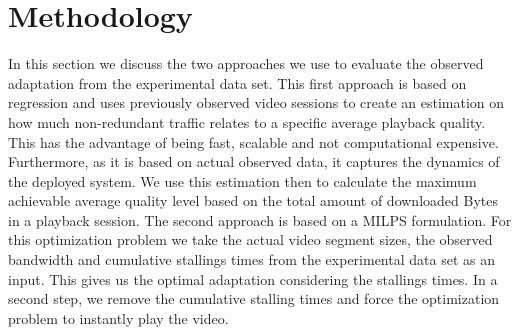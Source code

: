 
\section{Methodology}

\label{sec:sysmodel}

In this section we discuss the two approaches we use to evaluate the observed adaptation from the experimental data set.
This first approach is based on regression and uses previously observed video sessions to create an estimation on how much non-redundant traffic relates to a specific average playback quality.
This has the advantage of being fast, scalable and not computational expensive. 
Furthermore, as it is based on actual observed data, it captures the dynamics of the deployed system.
We use this estimation then to calculate the maximum achievable average quality level based on the total amount of downloaded Bytes in a playback session.
The second approach is based on a MILPS formulation. 
For this optimization problem we take the actual video segment sizes, the observed bandwidth and cumulative stallings times from the experimental data set as an input.
This gives us the optimal adaptation considering the stallings times.
In a second step, we remove the cumulative stalling times and force the optimization problem to instantly play the video.




